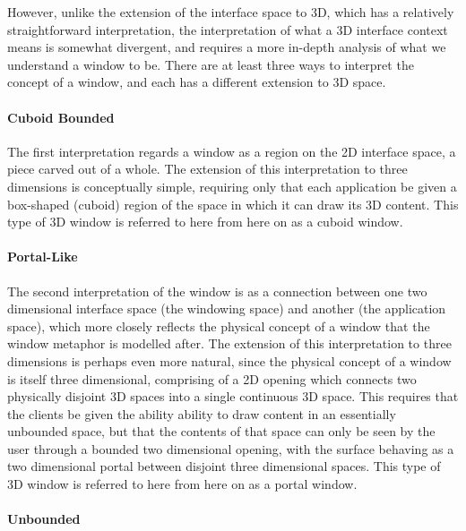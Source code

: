 However, unlike the extension of the interface space to 3D, which has a relatively straightforward interpretation, the interpretation of what a 3D interface context means is somewhat divergent, and requires a more in-depth analysis of what we understand a window to be. There are at least three ways to interpret the concept of a window, and each has a different extension to 3D space.

\paragraph{Cuboid Bounded}

The first interpretation regards a window as a region on the 2D interface space, a piece carved out of a whole. The extension of this interpretation to three dimensions is conceptually simple, requiring only that each application be given a box-shaped (cuboid) region of the space in which it can draw its 3D content. This type of 3D window is referred to here from here on as a cuboid window.

\paragraph{Portal-Like}

The second interpretation of the window is as a connection between one two dimensional interface space (the windowing space) and another (the application space), which more closely reflects the physical concept of a window that the window metaphor is modelled after. The extension of this interpretation to three dimensions is perhaps even more natural, since the physical concept of a window is itself three dimensional, comprising of a 2D opening which connects two physically disjoint 3D spaces into a single continuous 3D space. This requires that the clients be given the ability ability to draw content in an essentially unbounded space, but that the contents of that space can only be seen by the user through a bounded two dimensional opening, with the surface behaving as a two dimensional portal between disjoint three dimensional spaces. This type of 3D window is referred to here from here on as a portal window.

\paragraph{Unbounded}

